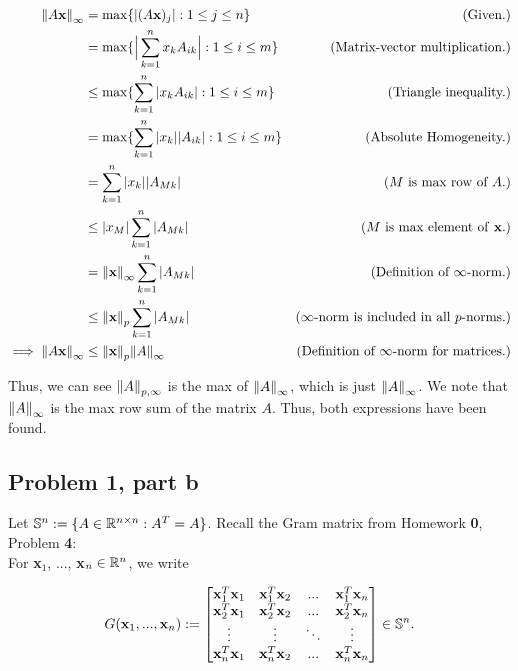 \begin{solution}
    \alignbreak
    \begin{align}
        \norm{A\textbf{x}}_\infty &= \max \{ |(A\textbf{x})_j | : 1 \leq j \leq n\} &\text{(Given.)}\nonumber\\
        &= \max \{ \Big|\sum_{k = 1}^nx_kA_{ik}\Big| : 1 \leq i \leq m\} &\text{(Matrix-vector multiplication.)}\nonumber\\
        &\leq \max \{ \sum_{k = 1}^n|x_kA_{ik}| : 1 \leq i \leq m\} &\text{(Triangle inequality.)}\nonumber\\
        &= \max \{ \sum_{k = 1}^n|x_k||A_{ik}| : 1 \leq i \leq m\} &\text{(Absolute Homogeneity.)}\nonumber\\
        &= \sum_{k = 1}^n|x_k||A_{Mk}| &\text{($M$ is max row of $A$.)}\nonumber\\
        &\leq |x_M|\sum_{k = 1}^n|A_{Mk}| &\text{($M$ is max element of \textbf{x}.)}\nonumber\\
        &= \norm{\textbf{x}}_\infty\sum_{k = 1}^n|A_{Mk}| &\text{(Definition of $\infty$-norm.)}\nonumber\\
        &\leq \norm{\textbf{x}}_p\sum_{k = 1}^n|A_{Mk}| &\text{($\infty$-norm is included in all $p$-norms.)}\nonumber\\
        \implies \norm{A\textbf{x}}_\infty &\leq \norm{\textbf{x}}_p\norm{A}_\infty &\text{(Definition of $\infty$-norm for matrices.)}\nonumber
    \end{align}
    \alignbreak

    Thus, we can see $\norm{A}_{p,\infty}$ is the max of $\norm{A}_\infty$, which is just $\norm{A}_\infty$. We note that $\norm{A}_\infty$ is the max row sum of the matrix $A$. Thus, both expressions have been found.
\end{solution}

\newpage
\subsection{Problem 1, part b}
Let $\S^n := \{ A \in \R^{n\times n} : A^T = A \}$. Recall the Gram matrix from Homework \textbf{0}, Problem \textbf{4}:
\\
For \textbf{x}$_1$, ..., \textbf{x}$_n \in \R^n$, we write

\[
G(\textbf{x}_1, ...,\textbf{x}_n) := 
\begin{bmatrix}
    \textbf{x}_1^T\textbf{x}_1 &\textbf{x}_1^T\textbf{x}_2 &... &\textbf{x}_1^T\textbf{x}_n\\
    \textbf{x}_2^T\textbf{x}_1 &\textbf{x}_2^T\textbf{x}_2 &... &\textbf{x}_2^T\textbf{x}_n\\
    \vdots    &\vdots     &\ddots    &\vdots\\
    \textbf{x}_n^T\textbf{x}_1 &\textbf{x}_n^T\textbf{x}_2 &... &\textbf{x}_n^T\textbf{x}_n\\
\end{bmatrix}
\in \S^n.
\]

